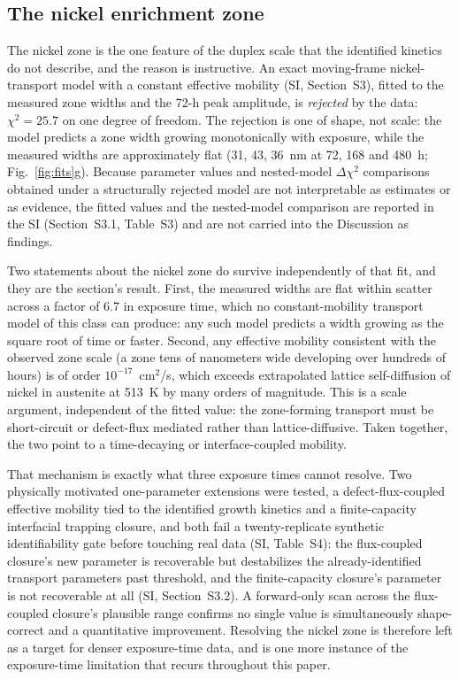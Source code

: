 \documentclass[pdflatex,sn-nature]{sn-jnl}
\begin{document}
\subsection{The nickel enrichment zone}\label{sec:nickel}

The nickel zone is the one feature of the duplex scale that the
identified kinetics do not describe, and the reason is instructive. An
exact moving-frame nickel-transport model with a constant effective
mobility (SI, Section~S3), fitted to the measured zone widths and the
72-h peak amplitude, is \emph{rejected} by the data: $\chi^2 = 25.7$ on
one degree of freedom. The rejection is one of shape, not scale: the
model predicts a zone width growing monotonically with exposure, while
the measured widths are approximately flat (31, 43, 36~nm at 72, 168 and
480~h; Fig.~\ref{fig:fits}g). Because parameter values and nested-model $\Delta\chi^2$
comparisons obtained under a structurally rejected model are not
interpretable as estimates or as evidence, the fitted values and the
nested-model comparison are reported in the SI (Section~S3.1,
Table~S3) and are not carried into the Discussion as findings.

Two statements about the nickel zone do survive independently of that
fit, and they are the section's result. First, the measured widths are
flat within scatter across a factor of 6.7 in exposure time, which no
constant-mobility transport model of this class can produce: any such
model predicts a width growing as the square root of time or faster.
Second, any effective mobility consistent with the observed zone
scale (a zone tens of nanometers wide developing over hundreds of
hours) is of order $10^{-17}$~cm$^2$/s, which exceeds extrapolated
lattice self-diffusion of nickel in austenite at 513~K by many orders of
magnitude. This is a scale argument, independent of the fitted value: the
zone-forming transport must be short-circuit or defect-flux mediated
rather than lattice-diffusive. Taken together, the two point to a
time-decaying or interface-coupled mobility.

That mechanism is exactly what three exposure times cannot resolve. Two
physically motivated one-parameter extensions were tested, a
defect-flux-coupled effective mobility tied to the identified growth
kinetics and a finite-capacity interfacial trapping closure, and both
fail a twenty-replicate synthetic identifiability gate before touching
real data (SI, Table~S4): the flux-coupled closure's new parameter is
recoverable but destabilizes the already-identified transport parameters
past threshold, and the finite-capacity closure's parameter is not
recoverable at all (SI, Section~S3.2). A forward-only scan across the
flux-coupled closure's plausible range confirms no single value is
simultaneously shape-correct
and a quantitative improvement. Resolving the nickel zone is therefore
left as a target for denser exposure-time data, and is one more instance
of the exposure-time limitation that recurs throughout this paper.
\end{document}
